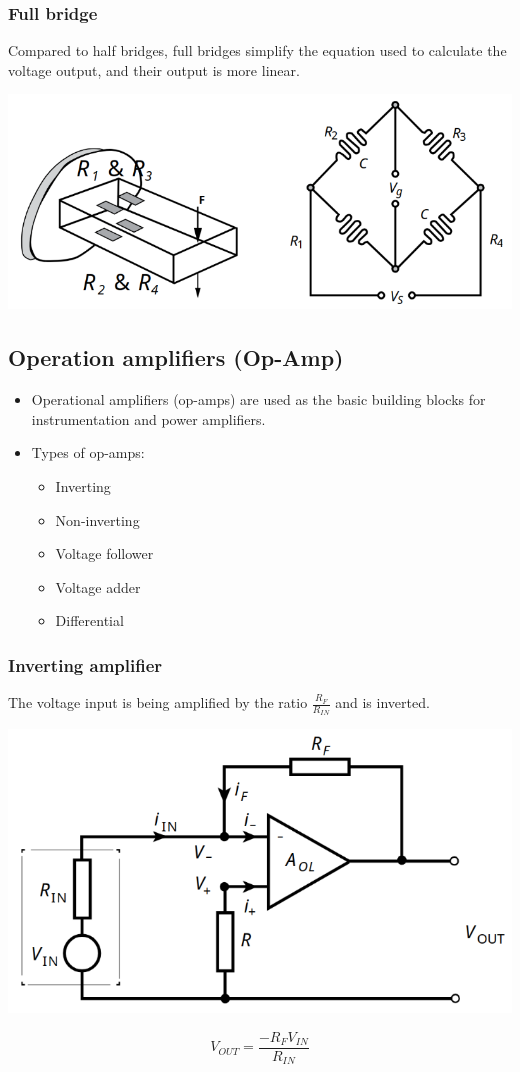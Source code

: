 \documentclass[11pt]{article}
\begin{document}
\subsubsection{Full bridge}
\label{sec:orga9719e3}
Compared to half bridges, full bridges simplify the equation used to calculate the voltage output, and their output is more linear.
\begin{center}
\includegraphics[width=.9\linewidth]{./images/full-bridge-deflection-bridge.png}
\end{center}

 \newpage
\subsection{Operation amplifiers (Op-Amp)}
\label{sec:orgf95da56}
\begin{itemize}
\item Operational amplifiers (op-amps) are used as the basic building blocks for instrumentation and power amplifiers.
\item Types of op-amps:
\begin{itemize}
\item Inverting
\item Non-inverting
\item Voltage follower
\item Voltage adder
\item Differential
\end{itemize}
\end{itemize}
\subsubsection{Inverting amplifier}
\label{sec:orgb8edb89}
The voltage input is being amplified by the ratio \(\frac{R_F}{R_{IN}}\) and is inverted.
\begin{center}
\includegraphics[width=.9\linewidth]{./images/inverting-amplifier.png}
\end{center}
\[V_{OUT} = \frac{-R_F V_{IN}}{R_{IN}}\]
\end{document}
